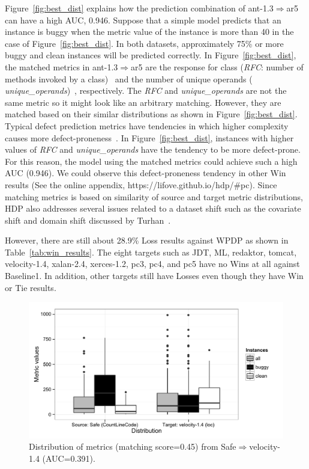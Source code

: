 Figure~\ref{fig:best_dist} explains how the prediction
combination of ant-1.3$\Rightarrow$ar5 can have a high AUC, 0.946. Suppose
that a simple model predicts that an instance is buggy when the metric value of
the instance is more than 40 in the case of Figure~\ref{fig:best_dist}. In both
datasets, approximately 75\% or more buggy and clean instances will be
predicted correctly. In Figure~\ref{fig:best_dist}, the matched metrics in
ant-1.3$\Rightarrow$ar5 are the response for class ({\em RFC}: number of methods
invoked by a class)~\cite{Chidamber94} and the number of unique operands ({\em
unique\_operands})~\cite{Halstead77}, respectively. The {\em RFC} and {\em
unique\_operands} are not the same metric so it might look like an arbitrary
matching. However, they are matched based on their similar distributions as
shown in Figure~\ref{fig:best_dist}. Typical defect prediction metrics have
tendencies in which higher complexity causes more
defect-proneness~\cite{DAmbros12,Menzies07,Rahman13}. In
Figure~\ref{fig:best_dist}, instances with higher values of {\em RFC} and {\em
unique\_operands} have the tendency to be more defect-prone. For this reason, the
model using the matched metrics could achieve such a high AUC (0.946). We could
observe this defect-proneness tendency in other Win results (See the online appendix, https://lifove.github.io/hdp/\#pc). Since matching metrics is
based on similarity of source and target metric distributions, HDP also
addresses several issues related to a dataset shift such as the covariate shift
and domain shift discussed by Turhan~\cite{Turhan12}.



However, there are still about 28.9\% Loss results against WPDP as shown in Table~\ref{tab:win_results}. The eight targets such as JDT, ML, redaktor, tomcat, velocity-1.4, xalan-2.4,
xerces-1.2, pc3, pc4, and pc5 have no Wins at all against Baseline1. In
addition, other targets still have Losses even though they have Win or Tie
results.


\begin{figure}[t]
	\centering
	\includegraphics[width=\linewidth]{Figures/Result/loss_dist_bplot.pdf}
	\caption{Distribution of metrics (matching score=0.45)
	from Safe$\Rightarrow$velocity-1.4 (AUC=0.391).}
	\label{fig:loss_dist}
\end{figure}



